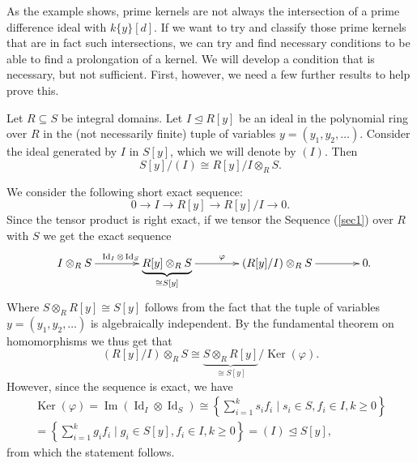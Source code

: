 As the example shows, prime kernels are not always the intersection of a prime difference ideal with $k\{y\}[d]$. 
If we want to try and classify those prime kernels that are in fact such intersections, we can try and find necessary conditions to be able to find a prolongation of a kernel. 
We will develop a condition that is necessary, but not sufficient. First, however, we need a few further results to help prove this.

\begin{lem}\label{lemtensor}
Let $R \subseteq S$ be integral domains. Let $I \unlhd R[y]$ be an ideal in the polynomial ring over $R$ in the (not necessarily finite) tuple of variables $y=(y_1,y_2,\ldots)$. Consider the ideal generated by $I$ in $S[y]$, which we will denote by $(I)$.
Then $$S[y]/(I) \cong R[y]/I \otimes_R S.$$

\begin{bew}
We consider the following short exact sequence:
\begin{equation}\label{sec1}
0 \rightarrow I \rightarrow R[y] \rightarrow R[y]/I \rightarrow 0.
\end{equation}
Since the tensor product is right exact, if we tensor the Sequence (\ref{sec1}) over $R$ with $S$ we get the exact sequence
\[
\begin{xy}
\xymatrixcolsep{3.2pc}
 \xymatrix{
I \otimes_R S \ar[r]^{\operatorname{Id}_I \otimes \operatorname{Id}_S} & \underbrace{ R[y] \otimes_R S}_{\cong S[y]} \ar[r]^\varphi & (R[y]/I) \otimes_R S  \ar[r] &  0 }
\end{xy}.
\]
Where $S \otimes_R R[y] \cong S[y]$ follows from the fact that the tuple of variables $y = (y_1,y_2,\ldots)$ is algebraically independent.  By the fundamental theorem on homomorphisms we thus get that $$(R[y]/I) \otimes_R S \cong \underbrace{ S \otimes_R R[y]}_{\cong S[y]}/\operatorname{Ker}(\varphi).$$
However, since the sequence is exact, we have
\begin{align*} \operatorname{Ker}(\varphi) = \operatorname{Im}(\operatorname{Id}_I \otimes \operatorname{Id}_S) \cong \left\{ \sum_{i = 1}^k s_i f_i \mid s_i \in S, f_i \in I, k \geq 0 \right\} \\ =  \left\{ \sum_{i = 1}^k g_i f_i \mid g_i \in S[y], f_i \in I, k \geq 0 \right\} = (I) \unlhd S[y], \end{align*}
from which the statement follows.
\end{bew}

\end{lem}


